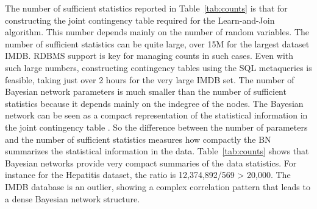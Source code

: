 \documentclass{acm_proc_article-sp}
\begin{document}
The number of sufficient statistics reported in Table~\ref{tab:counts}  is that for constructing the joint contingency table required for the Learn-and-Join algorithm. This number depends mainly on the number of random variables. The number of sufficient statistics can be quite large, over 15M for the largest dataset IMDB. RDBMS support is key for managing counts in such cases. Even with such large numbers, constructing contingency tables using the SQL metaqueries is feasible, taking just over 2 hours for the very large IMDB set. The number of Bayesian network parameters is much smaller than the number of sufficient statistics because it depends mainly on the indegree of the nodes. The Bayesian network can be seen as a compact representation of the statistical information in the joint contingency table \cite{Schulte2014}. So the difference between the number of parameters and the number of sufficient statistics measures how compactly the BN summarizes the statistical information in the data.  Table~\ref{tab:counts} shows that Bayesian networks provide very compact summaries of the data statistics. For instance for the Hepatitis dataset, the ratio is  12,374,892/569 > 20,000. The IMDB database is an outlier, showing a complex correlation pattern that leads to a dense Bayesian network structure.
\end{document}
